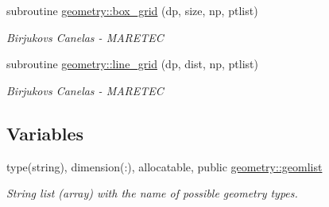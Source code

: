 \begin{DoxyCompactItemize}
subroutine \hyperlink{namespacegeometry_ab7f40c137db819829d3110dac77a2977}{geometry\+::box\+\_\+grid} (dp, size, np, ptlist)
\begin{DoxyCompactList}\small\item\em Birjukovs Canelas -\/ M\+A\+R\+E\+T\+EC \end{DoxyCompactList}\item 
subroutine \hyperlink{namespacegeometry_a7d580229bc67448e6389d0beef0c04cb}{geometry\+::line\+\_\+grid} (dp, dist, np, ptlist)
\begin{DoxyCompactList}\small\item\em Birjukovs Canelas -\/ M\+A\+R\+E\+T\+EC \end{DoxyCompactList}\end{DoxyCompactItemize}
\subsection*{Variables}
\begin{DoxyCompactItemize}
\item 
type(string), dimension(\+:), allocatable, public \hyperlink{namespacegeometry_a879bd9ccab6fc42f051bbfc9f0560a62}{geometry\+::geomlist}
\begin{DoxyCompactList}\small\item\em String list (array) with the name of possible geometry types. \end{DoxyCompactList}\end{DoxyCompactItemize}

